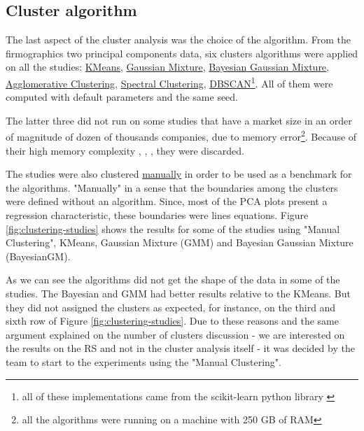 \subsection{Cluster algorithm}
\label{ch:cluster-algorithm}

The last aspect of the cluster analysis was the choice of the algorithm. From the firmographics two principal components data, six clusters algorithms were applied on all the studies: \underline{KMeans}, \underline{Gaussian Mixture}, \underline{Bayesian Gaussian Mixture}, \underline{Agglomerative Clustering}, \underline{Spectral Clustering}, \underline{DBSCAN}\footnote{all of these implementations came from the scikit-learn python library \cite{scikit-learn}}. All of them were computed with default parameters and the same seed.

The latter three did not run on some studies that have a market size in an order of magnitude of dozen of thousands companies, due to memory error\footnote{all the algorithms were running on a machine with 250 GB of RAM}. Because of their high memory complexity \cite{franti2006fast}, \cite{ester1996density}, \cite{yan2009fast}, they were discarded.

The studies were also clustered \underline{manually} in order to be used as a benchmark for the algorithms. "Manually" in a sense that the boundaries among the clusters were defined without an algorithm. Since, most of the PCA plots present a regression characteristic, these boundaries were lines equations. Figure \ref{fig:clustering-studies} shows the results for some of the studies using "Manual Clustering", KMeans, Gaussian Mixture (GMM) and Bayesian Gaussian Mixture (BayesianGM).

As we can see the algorithms did not get the shape of the data in some of the studies. The Bayesian and GMM had better results relative to the KMeans. But they did not assigned the clusters as expected, for instance, on the third and sixth row of Figure \ref{fig:clustering-studies}. Due to these reasons and the same argument explained on the number of clusters discussion - we are interested on the results on the RS and not in the cluster analysis itself - it was decided by the team to start to the experiments using the "Manual Clustering".

